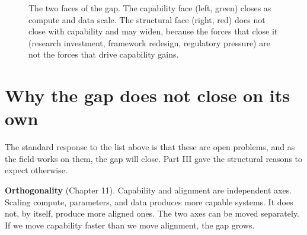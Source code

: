 \begin{figure}[h]
\centering
{}
\caption{The two faces of the gap. The capability face (left, green) closes as compute and data scale. The structural face (right, red) does not close with capability and may widen, because the forces that close it (research investment, framework redesign, regulatory pressure) are not the forces that drive capability gains.}
\label{fig:two-faces}
\end{figure}

\section*{Why the gap does not close on its own}

The standard response to the list above is that these are open problems, and as the field works on them, the gap will close. Part III gave the structural reasons to expect otherwise.

\textbf{Orthogonality} (Chapter 11). Capability and alignment are independent axes. Scaling compute, parameters, and data produces more capable systems. It does not, by itself, produce more aligned ones. The two axes can be moved separately. If we move capability faster than we move alignment, the gap grows.

